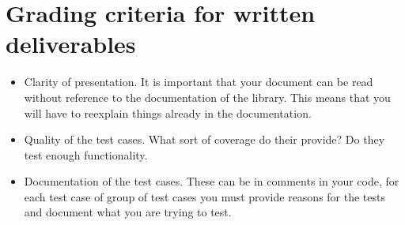 \documentclass[a4page]{article}
\begin{document}
\section{Grading criteria for written deliverables}
\begin{itemize}
\item Clarity of presentation. It is important that your document can
  be read without reference to the documentation of the library. This
  means that you will have to reexplain things already in the
  documentation. 
\item Quality of the test cases. What sort of coverage do their
  provide? Do they test enough functionality. 
\item Documentation of the test cases. These can be in comments in
  your code, for each test case of group of test cases you must
  provide reasons for the tests and document  what you are trying to
  test.
 
\end{itemize}
\end{document}
